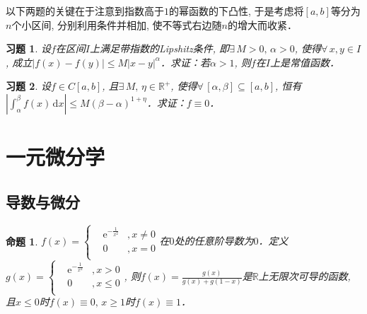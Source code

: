 \documentclass[11pt,a4paper]{ctexart}
\makeatletter
\theoremstyle{thmseries} %
\newtheorem{thm}{定理}[section]
\newtheorem{prop}{命题}[section]
\theoremstyle{exerseries}
\newtheorem{exer}{习题}[section]
\renewenvironment{proof}[1][\proofname]{\par
  \pushQED{\qed}%
  \normalfont \topsep6\p@\@plus6\p@\relax
  \trivlist
  \item[\hskip\labelsep
        \itshape
    #1\@addpunct{}]\ignorespaces
}{%
  \popQED\endtrivlist\@endpefalse
}
\newenvironment{pf}{\begin{proof}[\bfseries\upshape 证\quad]}{\end{proof}}
\newcommand{\bra}[1]{\mathopen{}\left(#1\right)}
\renewcommand{\phi}{\varphi}
\newcommand{\R}{\mathbb{R}}
\renewcommand{\d}{\mathrm{d}}
\newcommand{\e}{\mathrm{e}}
\makeatother
\begin{document}
以下两题的关键在于注意到指数高于$1$的幂函数的下凸性, 于是考虑将$[a,b]$等分为$n$个小区间, 分别利用条件并相加, 使不等式右边随$n$的增大而收紧．
\begin{exer}
	设$f$在区间$I$上满足带指数的Lipshitz条件, 即$\exists\,M>0,\,\alpha>0$, 使得$\forall\,x,y\in I$, 成立$|f(x)-f(y)|\leq M|x-y|^\alpha$．求证：若$\alpha>1$, 则$f$在$I$上是常值函数．
\end{exer}

\begin{exer}
	设$f\in C[a,b]$, 且$\exists\,M,\,\eta\in\R^+$, 使得$\forall\,[\alpha,\beta]\subseteq[a,b]$, 恒有$\left|\int_{\alpha}^{\beta}f(x)\,\d x\right|\leq M(\beta-\alpha)^{1+\eta}$．求证：$f\equiv0$．
\end{exer}


\section{一元微分学}
\subsection{导数与微分}


\begin{prop}
	$f(x)=\left\{\begin{aligned}
		&\e^{-\frac{1}{x^2}}&,x\neq0\\
		&0&,x=0\\
	\end{aligned}\right.$在$0$处的任意阶导数为$0$．定义$g(x)=\left\{\begin{aligned}
		&\e^{-\frac{1}{x^2}}&,x>0\\
		&0&,x\leq0\\
	\end{aligned}\right.$, 则$f(x)=\frac{g(x)}{g(x)+g(1-x)}$是$\R$上无限次可导的函数, 且$x\leq0$时$f(x)\equiv0,\,x\geq1$时$f(x)\equiv1$．
\end{prop}
\end{document}

